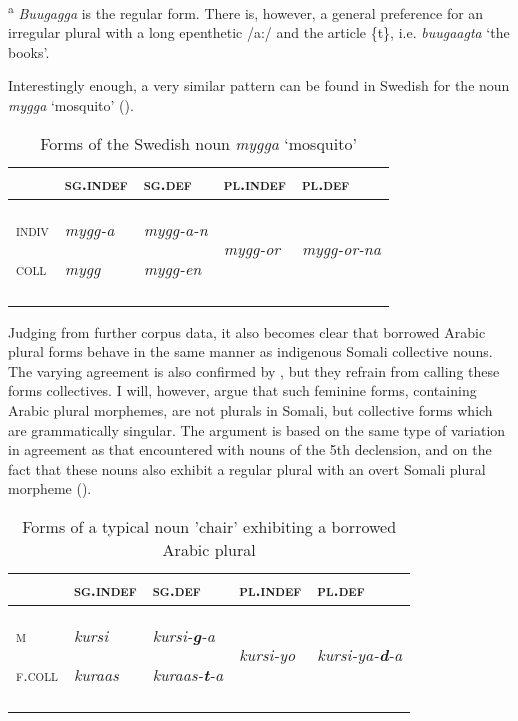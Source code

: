 \documentclass[output=paper]{langsci/langscibook}
\begin{document}
\textsuperscript{a} \textit{Buugagga} is the regular form. There is, however, a general preference for an irregular plural with a long epenthetic /a:/ and the article \{t\}, i.e. \textit{buugaagta} ‘the books’.

Interestingly enough, a very similar pattern can be found in Swedish for the noun \textit{mygga} ‘mosquito’ ().\textit{} 


\begin{table}
\caption{Forms of the Swedish noun \textit{mygga} ‘mosquito’}
\label{tab:nilsson:11}
\begin{tabularx}{\textwidth}{XXXXX} 
\lsptoprule
& {\textsc{sg.indef}} & {\textsc{sg.def}} & {\textsc{pl.indef}} & {\textsc{pl.def}}\\
\midrule
{\textsc{indiv}}

{\textsc{coll}} & {\textit{mygg-a}}

{\textit{mygg}} & {\textit{mygg-a-n}}

{\textit{mygg-en}} & {\textit{mygg-or}} & {\textit{mygg-or-na}}\\
\lspbottomrule
\end{tabularx}

\end{table} 



Judging from further corpus data, it also becomes clear that borrowed Arabic plural forms behave in the same manner as indigenous Somali collective nouns. The varying agreement is also confirmed by \citet[86]{Siyaad1984}, but they refrain from calling these forms collectives. I will, however, argue that such feminine forms, containing Arabic plural morphemes, are not plurals in Somali, but collective forms which are grammatically singular. The argument is based on the same type of variation in agreement as that encountered with nouns of the 5th declension, and on the fact that these nouns also exhibit a regular plural with an overt Somali plural morpheme ().
 
\begin{table}
\caption{Forms of a typical noun 'chair' exhibiting a borrowed Arabic plural}
\label{tab:nilsson:12}
\begin{tabularx}{\textwidth}{XXXXX}
\lsptoprule
 & {\textsc{sg.indef}} & {\textsc{sg.def}} & {\textsc{pl.indef}} & {\textsc{pl.def}}\\
\midrule
{\textsc{m}}

{\textsc{f.coll}} & {\textit{kursi}}

{\textit{kuraas}} & {\textit{kursi-}\textbf{\textit{g}}\textit{-a}}

{\textit{kuraas-}\textbf{\textit{t}}\textit{-a}} & {\textit{kursi-yo}} & {\textit{kursi-ya-}\textbf{\textit{d}}\textit{-a}}\\
\lspbottomrule
\end{tabularx}

\end{table} 
\end{document}
